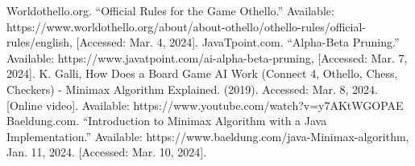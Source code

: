 \documentclass[conference]{IEEEtran}
\begin{document}
\begin{thebibliography}{00}
 Worldothello.org. “Official Rules for the Game Othello.” Available: https://www.worldothello.org/about/about-othello/othello-rules/official-rules/english, [Accessed: Mar. 4, 2024].
 JavaTpoint.com. “Alpha-Beta Pruning.” Available: https://www.javatpoint.com/ai-alpha-beta-pruning,  [Accessed: Mar. 7, 2024].
 K. Galli, How Does a Board Game AI Work (Connect 4, Othello, Chess, Checkers) - Minimax Algorithm Explained. (2019). Accessed: Mar. 8, 2024. [Online video]. Available: https://www.youtube.com/watch?v=y7AKtWGOPAE
 Baeldung.com. “Introduction to Minimax Algorithm with a Java Implementation.” Available: https://www.baeldung.com/java-Minimax-algorithm, Jan. 11, 2024. [Accessed: Mar. 10, 2024].

\end{thebibliography}
\vspace{12pt}
\end{document}
